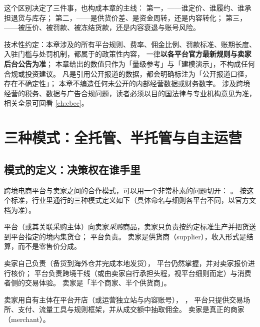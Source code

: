 这个区别决定了三件事，也构成本章的主线：
第一，——谁定价、谁履约、谁承担退货与库存；
第二，——是供货价差、是资金周转，还是内容转化；
第三，——被压价、被罚款、被冻结货款，还是内容衰退与账号风险。

技术性约定：本章涉及的所有平台规则、费率、佣金比例、罚款标准、账期长度、
入驻门槛与处罚机制，都属于的政策性内容，
一律\textbf{以各平台官方最新规则与卖家后台公告为准}；
本章给出的数值只作为「量级参考」与「建模演示」，不构成任何合规或投资建议。
凡是引用公开报道的数据，都会明确标注为「公开报道口径，存在不确定性」；
本章不编造任何未公开的内部经营数据或财务数字。
涉及跨境经营的税务、数据与广告合规问题，读者必须以目的国法律与专业机构意见为准，
相关全景可回看 \cref{ch:cbec}。

\section{三种模式：全托管、半托管与自主运营}
\label{sec:plat-modes}

\subsection{模式的定义：决策权在谁手里}

跨境电商平台与卖家之间的合作模式，可以用一个非常朴素的问题切开：
。
按这个标准，行业里通行的三种模式定义如下（具体命名与细则各平台不同，以官方文档为准）。

\begin{definition}[全托管模式]
平台（或其关联采购主体）向卖家\emph{采购}商品，卖家只负责按约定标准生产并把货送到平台指定的境内集货仓；
平台负责。
卖家是供货商（supplier），收入形式是结算，而不是零售价分成。
\end{definition}

\begin{definition}[半托管模式]
卖家自己负责（备货到海外仓并完成本地发货），
平台仍然掌握，并对卖家报价进行核价；
平台负责跨境干线（或由卖家自行承担头程，视平台细则而定）与消费者侧的交易体验。
卖家是「半个商家、半个供货商」。
\end{definition}

\begin{definition}[自主运营模式]
卖家用自有主体在平台开店（或运营独立站与内容账号），
，
平台只提供交易场所、支付、流量工具与规则框架，并从成交额中抽取佣金。
卖家是真正的商家（merchant）。
\end{definition}

